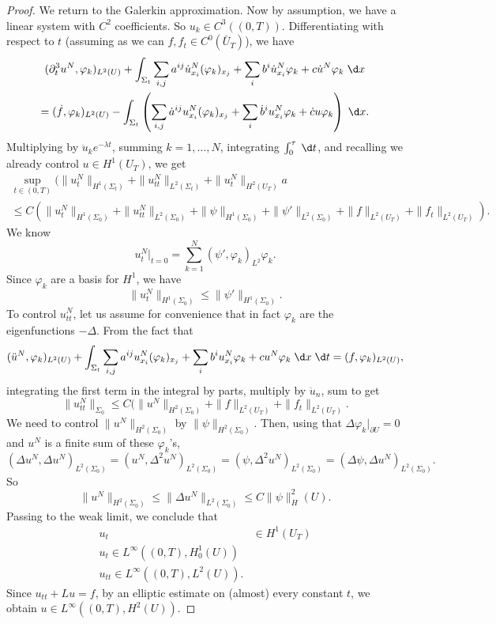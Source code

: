 \documentclass[a4paper]{article}
\begin{document}
\begin{proof}
  We return to the Galerkin approximation. Now by assumption, we have a linear system with $C^2$ coefficients. So $u_k \in C^3((0, T))$. Differentiating with respect to $t$ (assuming as we can $f, f_t \in C^0(\bar{U}_T)$), we have
  \begin{multline*}
    (\partial_t^3 u^N, \varphi_k)_{L^2(U)} + \int_{\Sigma_t} \sum_{i, j} a^{ij} \dot{u}_{x_i}^N (\varphi_k)_{x_j} + \sum_i b^i \dot{u}_{x_i}^N \varphi_k + c \dot{u}^N \varphi_k \;\d x\\
    = (\dot{f}, \varphi_k)_{L^2(U)} - \int_{\Sigma_t} \left( \sum_{i, j} \dot{a}^{ij} u_{x_i}^N (\varphi_k)_{x_j} + \sum_i \dot{b}^i u_{x_i}^N \varphi_k + \dot{c} u \varphi_k \right)\;\d x.
  \end{multline*}
  Multiplying by $\ddot{u}_k e^{-\lambda t}$, summing $k = 1, \ldots, N$, integrating $\int_0^\tau \;\d t$, and recalling we already control $u \in H^1(U_T)$, we get
  \begin{multline*}
    \sup_{t \in (0, T)} (\|u_t^N\|_{H^1(\Sigma_t)} + \|u_{tt}^N\|_{L^2(\Sigma_t)} + \|u_t^N\|_{H^2(U_T)}a\\
    \leq C\left(\|u_t^N\|_{H^1(\Sigma_0)} + \|u_{tt}^N\|_{L^2(\Sigma_0)} + \|\psi\|_{H^1(\Sigma_0)} + \|\psi'\|_{L^2(\Sigma_0)} + \|f\|_{L^2(U_T)} + \|f_t\|_{L^2(U_T)}\right).
  \end{multline*}
  We know
  \[
    u_t^N|_{t = 0} = \sum_{k = 1}^N (\psi', \varphi_k)_{L^2} \varphi_k.
  \]
  Since $\varphi_k$ are a basis for $H^1$, we have
  \[
    \|u_t^N\|_{H^1(\Sigma_0)} \leq \|\psi'\|_{H^1(\Sigma_0)}.
  \]
  To control $u^N_{tt}$, let us assume for convenience that in fact $\varphi_k$ are the eigenfunctions $-\Delta$. From the fact that
  \[
    (\ddot{u}^N, \varphi_k)_{L^2(U)} + \int_{\Sigma_t} \sum_{i, j} a^{ij} u_{x_i}^N (\varphi_k)_{x_j} + \sum_i b^i u_{x_i}^N \varphi_k + c u^N \varphi_k\;\d x\;\d t = (f, \varphi_k)_{L^2(U)},
  \]
  integrating the first term in the integral by parts, multiply by $\ddot{u}_n$, sum to get
  \[
    \|u_{tt}^N\|_{\Sigma_0} \leq C(\|u^N\|_{H^2(\Sigma_0)} + \|f\|_{L^2(U_T)} + \|f_t\|_{L^2(U_T)}.
  \]
  We need to control $\|u^N\|_{H^2(\Sigma_0)}$ by $\|\psi\|_{H^2(\Sigma_0)}$. Then, using that $\Delta\varphi_k|_{\partial U} = 0$ and $u^N$ is a finite sum of these $\varphi_k$'s,
  \[
    (\Delta u^N, \Delta u^N)_{L^2(\Sigma_0)} = (u^N, \Delta^2 u^N)_{L^2(\Sigma_0)} = (\psi, \Delta^2 u^N)_{L^2(\Sigma_0)} = (\Delta \psi, \Delta u^N)_{L^2(\Sigma_0)}.
  \]
  So
  \[
    \|u^N\|_{H^2(\Sigma_0)} \leq \|\Delta u^N\|_{L^2(\Sigma_0)} \leq C \|\psi\|_H^2(U).
  \]
  Passing to the weak limit, we conclude that
  \begin{align*}
    u_t &\in H^1(U_T)\\
    u_t \in L^\infty((0, T), H_0^1(U))\\
    u_{tt} \in L^\infty((0, T), L^2(U)).
  \end{align*}
  Since $u_{tt} + Lu = f$, by an elliptic estimate on (almost) every constant $t$, we obtain $u \in L^\infty((0, T), H^2(U))$.
\end{proof}
\end{document}
